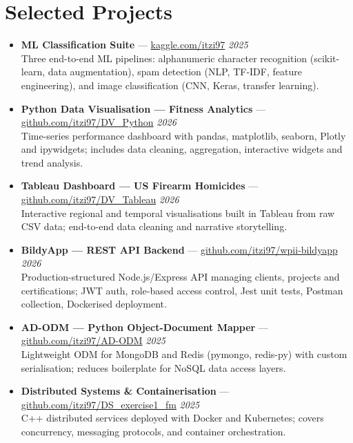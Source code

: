 \documentclass[10pt,a4paper]{article}
\begin{document}
\section{Selected Projects}
{\small
\begin{itemize}

  \item \textbf{ML Classification Suite} --- \href{https://www.kaggle.com/itzi97}{kaggle.com/itzi97} \hfill \textit{2025}\\
  Three end-to-end ML pipelines: alphanumeric character recognition (scikit-learn, data augmentation),
  spam detection (NLP, TF-IDF, feature engineering), and image classification (CNN, Keras, transfer learning).

  \item \textbf{Python Data Visualisation --- Fitness Analytics} --- \href{https://github.com/itzi97/DV_Python}{github.com/itzi97/DV\_Python} \hfill \textit{2026}\\
  Time-series performance dashboard with pandas, matplotlib, seaborn, Plotly and ipywidgets;
  includes data cleaning, aggregation, interactive widgets and trend analysis.

  \item \textbf{Tableau Dashboard --- US Firearm Homicides} --- \href{https://github.com/itzi97/DV_Tableau}{github.com/itzi97/DV\_Tableau} \hfill \textit{2026}\\
  Interactive regional and temporal visualisations built in Tableau from raw CSV data;
  end-to-end data cleaning and narrative storytelling.

  \item \textbf{BildyApp --- REST API Backend} --- \href{https://github.com/itzi97/wpii-bildyapp}{github.com/itzi97/wpii-bildyapp} \hfill \textit{2026}\\
  Production-structured Node.js/Express API managing clients, projects and certifications;
  JWT auth, role-based access control, Jest unit tests, Postman collection, Dockerised deployment.

  \item \textbf{AD-ODM --- Python Object-Document Mapper} --- \href{https://github.com/itzi97/AD-ODM}{github.com/itzi97/AD-ODM} \hfill \textit{2025}\\
  Lightweight ODM for MongoDB and Redis (pymongo, redis-py) with custom serialisation;
  reduces boilerplate for NoSQL data access layers.

  \item \textbf{Distributed Systems \& Containerisation} --- \href{https://github.com/itzi97/DS_exercise1_fm}{github.com/itzi97/DS\_exercise1\_fm} \hfill \textit{2025}\\
  C++ distributed services deployed with Docker and Kubernetes;
  covers concurrency, messaging protocols, and container orchestration.

\end{itemize}
}
\end{document}
